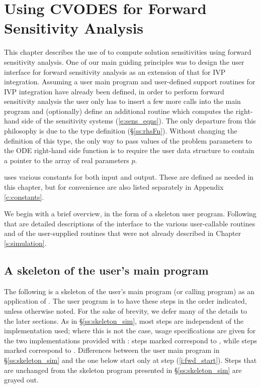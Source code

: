 \chapter{Using CVODES for Forward Sensitivity Analysis}\label{s:forward}

This chapter describes the use of {\cvodes} to compute solution sensitivities using
forward sensitivity analysis. One of our main guiding principles was to design 
the {\cvodes} user interface for forward sensitivity analysis as an extension of
that for IVP integration. Assuming a user main program and user-defined support 
routines for IVP integration have already been defined, in order to perform 
forward sensitivity analysis the user only has to insert a few more calls 
into the main program and (optionally) define an additional routine which
computes the right-hand side of the sensitivity systems (\ref{e:sens_eqns}). 
The only departure from this philosophy is due to the  type definition
(\S\ref{ss:rhsFn}). Without changing the definition of this type, the
only way to pass values of the problem parameters to the ODE right-hand side
function is to require the user data structure  to contain a pointer
to the array of real parameters $p$.

{\cvodes} uses various constants for both input and output.  These are
defined as needed in this chapter, but for convenience are also listed
separately in Appendix \ref{c:constants}.

We begin with a brief overview, in the form of a skeleton user program.
Following that are detailed descriptions of the interface to the
various user-callable routines and of the user-supplied routines that were not already
described in Chapter \ref{s:simulation}.

\section{A skeleton of the user's main program}\label{s:forward_usage}

The following is a skeleton of the user's main program (or calling
program) as an application of {\cvodes}. The user program is to have these 
steps in the order indicated, unless otherwise noted.
For the sake of brevity, we defer many of the details to the later sections.
As in \S\ref{ss:skeleton_sim}, most steps are independent of the {\nvector}
implementation used; where this is not the case, usage specifications are given for the
two implementations provided with {\cvodes}: steps marked {\p} correspond to 
{\nvecp}, while steps marked {\s} correspond to {\nvecs}.
Differences between the user main program in \S\ref{ss:skeleton_sim} and
the one below start only at step (\ref{i:fwd_start}).
Steps that are unchanged from the skeleton program presented in
\S\ref{ss:skeleton_sim} are grayed out.

